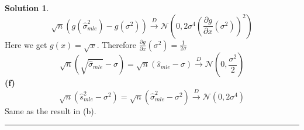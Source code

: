 \documentclass[a4paper, 10pt]{article}
\theoremstyle{definition}
\theoremstyle{hSol}
\newtheorem*{solution}{Solution}
\begin{document}
\begin{solution}
\begin{equation}
  \sqrt{n}(g(\hat{\sigma}^2_{mle})-g(\sigma^2)) \xrightarrow{D} \mathcal{N}\left(0, 2\sigma^4 \left(\frac{\partial g}{\partial x}(\sigma^2)\right)^2 \right)
\end{equation}
Here we get $g(x)=\sqrt{x}$. Therefore $\frac{\partial g}{\partial x}(\sigma^2) = \frac{1}{2\sigma}$
\begin{equation}
  \sqrt{n}(\sqrt{\hat{\sigma}_{mle}}-\sigma) = \sqrt{n}(\hat{s}_{mle}-\sigma)\xrightarrow{D} \mathcal{N}\left(0, \frac{\sigma^2}{2} \right)
\end{equation}
\textbf{(f)}
\begin{equation}
  \sqrt{n}(\hat{s}_{mle}^2-\sigma^2) = \sqrt{n}(\hat{\sigma}_{mle}^2-\sigma^2) \xrightarrow{D} \mathcal{N}\left(0, 2\sigma^4 \right)
\end{equation}
Same as the result in (b).
\end{solution}

\noindent\rule{16cm}{0.4pt}
\end{document}
